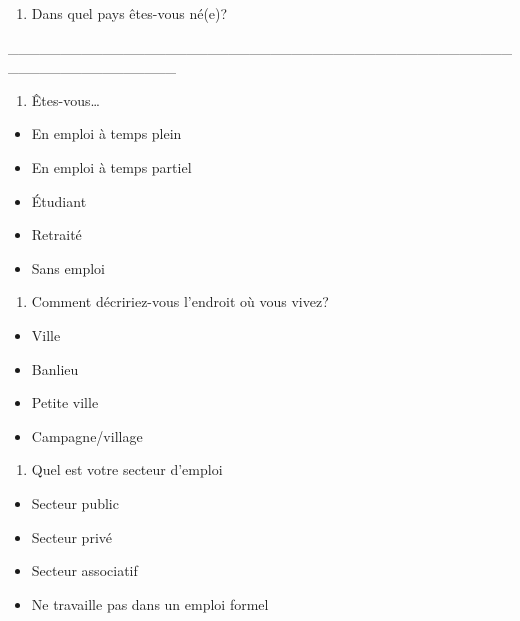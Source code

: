 \documentclass[
  letterpaper,
  DIV=11,
  numbers=noendperiod]{scrreprt}
\providecommand{\tightlist}{%
  \setlength{\itemsep}{0pt}\setlength{\parskip}{0pt}}\usepackage{longtable,booktabs,array}
\begin{document}
\begin{enumerate}
\def\labelenumi{\arabic{enumi}.}
\setcounter{enumi}{11}
\tightlist
\item
  Dans quel pays êtes-vous né(e)?
\end{enumerate}

\_\_\_\_\_\_\_\_\_\_\_\_\_\_\_\_\_\_\_\_\_\_\_\_\_\_\_\_\_\_\_\_\_\_\_\_\_\_\_\_\_\_\_\_\_\_\_\_\_\_\_\_\_\_\_\_\_\_\_\_\_\_\_\_

\begin{enumerate}
\def\labelenumi{\arabic{enumi}.}
\setcounter{enumi}{12}
\tightlist
\item
  Êtes-vous\ldots{}
\end{enumerate}

\begin{itemize}
\tightlist
\item
  En emploi à temps plein
\item
  En emploi à temps partiel
\item
  Étudiant
\item
  Retraité
\item
  Sans emploi
\end{itemize}

\begin{enumerate}
\def\labelenumi{\arabic{enumi}.}
\setcounter{enumi}{13}
\tightlist
\item
  Comment décririez-vous l'endroit où vous vivez?
\end{enumerate}

\begin{itemize}
\tightlist
\item
  Ville
\item
  Banlieu
\item
  Petite ville
\item
  Campagne/village
\end{itemize}

\begin{enumerate}
\def\labelenumi{\arabic{enumi}.}
\setcounter{enumi}{14}
\tightlist
\item
  Quel est votre secteur d'emploi
\end{enumerate}

\begin{itemize}
\tightlist
\item
  Secteur public
\item
  Secteur privé
\item
  Secteur associatif
\item
  Ne travaille pas dans un emploi formel
\end{itemize}
\end{document}
